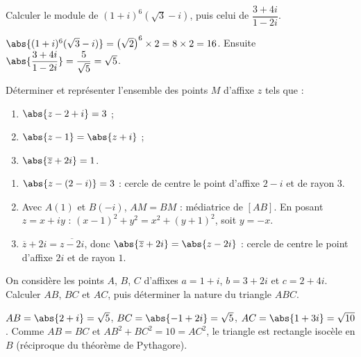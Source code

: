 \begin{exercise}
Calculer le module de $(1+i)^6\left(\sqrt3-i\right)$, puis celui de $\dfrac{3+4i}{1-2i}$.
\end{exercise}
\begin{solution}
$\abs{(1+i)^6(\sqrt3-i)}=\left(\sqrt2\right)^6\times2=8\times2=16$. Ensuite $\abs{\dfrac{3+4i}{1-2i}}=\dfrac{5}{\sqrt5}=\sqrt5$.
\end{solution}

\begin{exercise}
Déterminer et représenter l'ensemble des points $M$ d'affixe $z$ tels que :
\begin{enumerate}
\item $\abs{z-2+i}=3$ ;
\item $\abs{z-1}=\abs{z+i}$ ;
\item $\abs{\overline z+2i}=1$.
\end{enumerate}
\end{exercise}
\begin{solution}
\begin{enumerate}
\item $\abs{z-(2-i)}=3$ : cercle de centre le point d'affixe $2-i$ et de rayon $3$.
\item Avec $A(1)$ et $B(-i)$, $AM=BM$ : médiatrice de $[AB]$. En posant $z=x+iy$ : $(x-1)^2+y^2=x^2+(y+1)^2$, soit $y=-x$.
\item $\overline z+2i=\overline{z-2i}$, donc $\abs{\overline z+2i}=\abs{z-2i}$ : cercle de centre le point d'affixe $2i$ et de rayon $1$.
\end{enumerate}
\end{solution}

\begin{exercise}
On considère les points $A$, $B$, $C$ d'affixes $a=1+i$, $b=3+2i$ et $c=2+4i$. Calculer $AB$, $BC$ et $AC$, puis déterminer la nature du triangle $ABC$.
\end{exercise}
\begin{solution}
$AB=\abs{2+i}=\sqrt5$, $BC=\abs{-1+2i}=\sqrt5$, $AC=\abs{1+3i}=\sqrt{10}$. Comme $AB=BC$ et $AB^2+BC^2=10=AC^2$, le triangle est rectangle isocèle en $B$ (réciproque du théorème de Pythagore).
\end{solution}

